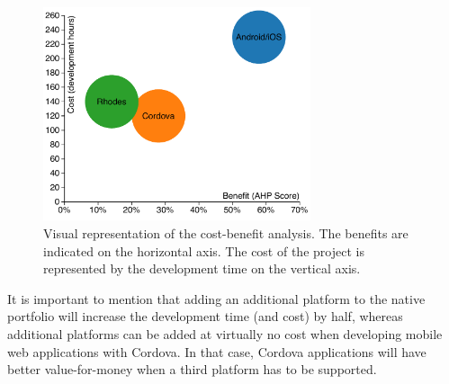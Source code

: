 \begin{figure}
    \centering
    \includegraphics[width=0.7\textwidth]{../resources/figs/benefit-cost.pdf}
    \caption{Visual representation of the cost-benefit analysis. The benefits are indicated on the horizontal axis. The cost of the project is represented by the development time on the vertical axis.}
    \label{fig:cost-benefit}
\end{figure}

It is important to mention that adding an additional platform to the native portfolio will increase the development time (and cost) by half, whereas additional platforms can be added at virtually no cost when developing mobile web applications with Cordova. In that case, Cordova applications will have better value-for-money when a third platform has to be supported.

